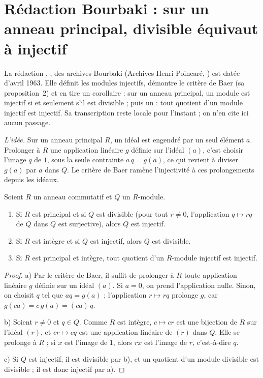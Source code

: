 \section[Rédaction Bourbaki \redac{397} : divisible et injectif sur un anneau principal]{Rédaction Bourbaki  : sur un anneau principal, divisible équivaut à injectif\protect{}}\label{sec:bourbaki-397}

La rédaction , , des archives Bourbaki (Archives Henri Poincaré, ) est datée d'avril 1963. Elle définit les modules injectifs, démontre le critère de Baer (sa proposition~2) et en tire un corollaire : sur un anneau principal, un module est injectif si et seulement s'il est divisible ; puis un  : tout quotient d'un module injectif est injectif. Sa transcription reste locale pour l'instant ; on n'en cite ici aucun passage.

\emph{L'idée.} Sur un anneau principal $R$, un idéal est engendré par un seul élément $a$. Prolonger à $R$ une application linéaire $g$ définie sur l'idéal $(a)$, c'est choisir l'image $q$ de $1$, sous la seule contrainte $a\,q = g(a)$, ce qui revient à diviser $g(a)$ par $a$ dans $Q$. Le critère de Baer ramène l'injectivité à ces prolongements depuis les idéaux.

\begin{encadre}
\begin{enonce}
Soient $R$ un anneau commutatif et $Q$ un $R$-module.
\begin{enumerate}
\item[a)] Si $R$ est principal et si $Q$ est divisible (pour tout $r \neq 0$, l'application $q \mapsto rq$ de $Q$ dans $Q$ est surjective), alors $Q$ est injectif.
\item[b)] Si $R$ est intègre et si $Q$ est injectif, alors $Q$ est divisible.
\item[c)] Si $R$ est principal et intègre, tout quotient d'un $R$-module injectif est injectif.
\end{enumerate}
\end{enonce}
\end{encadre}

\begin{proof}
a) Par le critère de Baer, il suffit de prolonger à $R$ toute application linéaire $g$ définie sur un idéal $(a)$. Si $a = 0$, on prend l'application nulle. Sinon, on choisit $q$ tel que $a q = g(a)$ ; l'application $r \mapsto r q$ prolonge $g$, car $g(c a) = c\,g(a) = (c a)\, q$.

b) Soient $r \neq 0$ et $q \in Q$. Comme $R$ est intègre, $c \mapsto c r$ est une bijection de $R$ sur l'idéal $(r)$, et $c r \mapsto c q$ est une application linéaire de $(r)$ dans $Q$. Elle se prolonge à $R$ ; si $x$ est l'image de $1$, alors $r x$ est l'image de $r$, c'est-à-dire $q$.

c) Si $Q$ est injectif, il est divisible par b), et un quotient d'un module divisible est divisible ; il est donc injectif par a).
\end{proof}

